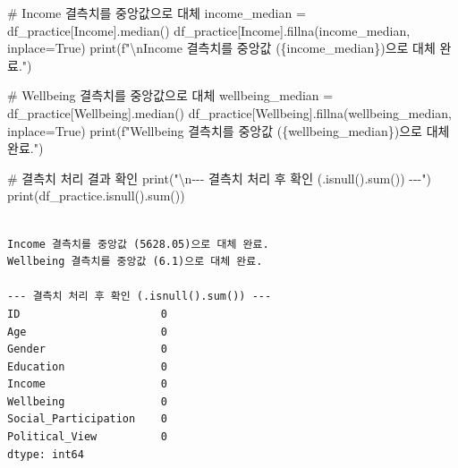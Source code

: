 \documentclass[
  letterpaper,
]{book}
\newenvironment{Shaded}{\begin{snugshade}}{\end{snugshade}}
\newcommand{\BuiltInTok}[1]{\textcolor[rgb]{0.00,0.23,0.31}{#1}}
\newcommand{\CharTok}[1]{\textcolor[rgb]{0.13,0.47,0.30}{#1}}
\newcommand{\CommentTok}[1]{\textcolor[rgb]{0.37,0.37,0.37}{#1}}
\newcommand{\NormalTok}[1]{\textcolor[rgb]{0.00,0.23,0.31}{#1}}
\newcommand{\OperatorTok}[1]{\textcolor[rgb]{0.37,0.37,0.37}{#1}}
\newcommand{\SpecialCharTok}[1]{\textcolor[rgb]{0.37,0.37,0.37}{#1}}
\newcommand{\SpecialStringTok}[1]{\textcolor[rgb]{0.13,0.47,0.30}{#1}}
\newcommand{\StringTok}[1]{\textcolor[rgb]{0.13,0.47,0.30}{#1}}
\newcommand{\VariableTok}[1]{\textcolor[rgb]{0.07,0.07,0.07}{#1}}
\begin{document}
\begin{Shaded}
\begin{Highlighting}[]
\CommentTok{\# Income 결측치를 중앙값으로 대체}
\NormalTok{income\_median }\OperatorTok{=}\NormalTok{ df\_practice[}\StringTok{\textquotesingle{}Income\textquotesingle{}}\NormalTok{].median()}
\NormalTok{df\_practice[}\StringTok{\textquotesingle{}Income\textquotesingle{}}\NormalTok{].fillna(income\_median, inplace}\OperatorTok{=}\VariableTok{True}\NormalTok{)}
\BuiltInTok{print}\NormalTok{(}\SpecialStringTok{f"}\CharTok{\textbackslash{}n}\SpecialStringTok{Income 결측치를 중앙값 (}\SpecialCharTok{\{}\NormalTok{income\_median}\SpecialCharTok{\}}\SpecialStringTok{)으로 대체 완료."}\NormalTok{)}

\CommentTok{\# Wellbeing 결측치를 중앙값으로 대체}
\NormalTok{wellbeing\_median }\OperatorTok{=}\NormalTok{ df\_practice[}\StringTok{\textquotesingle{}Wellbeing\textquotesingle{}}\NormalTok{].median()}
\NormalTok{df\_practice[}\StringTok{\textquotesingle{}Wellbeing\textquotesingle{}}\NormalTok{].fillna(wellbeing\_median, inplace}\OperatorTok{=}\VariableTok{True}\NormalTok{)}
\BuiltInTok{print}\NormalTok{(}\SpecialStringTok{f"Wellbeing 결측치를 중앙값 (}\SpecialCharTok{\{}\NormalTok{wellbeing\_median}\SpecialCharTok{\}}\SpecialStringTok{)으로 대체 완료."}\NormalTok{)}

\CommentTok{\# 결측치 처리 결과 확인}
\BuiltInTok{print}\NormalTok{(}\StringTok{"}\CharTok{\textbackslash{}n}\StringTok{{-}{-}{-} 결측치 처리 후 확인 (.isnull().sum()) {-}{-}{-}"}\NormalTok{)}
\BuiltInTok{print}\NormalTok{(df\_practice.isnull().}\BuiltInTok{sum}\NormalTok{())}
\end{Highlighting}
\end{Shaded}

\begin{verbatim}

Income 결측치를 중앙값 (5628.05)으로 대체 완료.
Wellbeing 결측치를 중앙값 (6.1)으로 대체 완료.

--- 결측치 처리 후 확인 (.isnull().sum()) ---
ID                      0
Age                     0
Gender                  0
Education               0
Income                  0
Wellbeing               0
Social_Participation    0
Political_View          0
dtype: int64
\end{verbatim}
\end{document}
